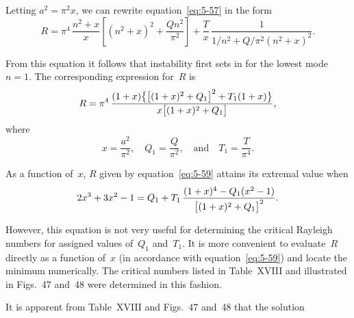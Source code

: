 Letting $a^{2} = \pi^{2}x$, we can rewrite equation~\eqref{eq:5-57} in
the form
\begin{equation}
  R = \pi^{4}\,\frac{n^{2}+x}{x}
  \left[
    (n^{2}+x)^{2}
    + \frac{Qn^{2}}{\pi^{2}}
  \right]
  + \frac{T}{x}\,
  \frac{1}{1/n^{2}+Q/\pi^{2}(n^{2}+x)^{2}}.
  \label{eq:5-58}
\end{equation}

From this equation it follows that instability first sets in for the lowest
mode $n = 1$.  The corresponding expression for~$R$ is
\begin{equation}
  R = \pi^{4}\,\frac{%
    (1+x)
    \bigl\{\bigl[(1+x)^{2}+Q_1\bigr]^{2}
    +T_1(1+x)\bigr\}}{%
    x\bigl[(1+x)^{2}+Q_1\bigr]},
  \label{eq:5-59}
\end{equation}
where
\begin{equation}
  x = \frac{a^{2}}{\pi^{2}}, \quad
  Q_1 = \frac{Q}{\pi^{2}}, \quad\text{and}\quad
  T_1 = \frac{T}{\pi^{4}}.
  \label{eq:5-60}
\end{equation}

As a function of~$x$, $R$ given by equation~\eqref{eq:5-59} attains its
extremal value when
\begin{equation}
  2x^{3}+3x^{2}-1
  = Q_1 + T_1\,
  \frac{(1+x)^{4}-Q_1(x^{2}-1)}{%
    \bigl[(1+x)^{2}+Q_1\bigr]^{2}}.
  \label{eq:5-61}
\end{equation}


However, this equation is not very useful for determining the critical Rayleigh
numbers for assigned values of~$Q_1$ and~$T_1$.  It is more convenient to
evaluate~$R$ directly as a function of~$x$ (in accordance with
equation~\eqref{eq:5-59}) and locate the minimum numerically.  The critical
numbers listed in Table~XVIII and illustrated in Figs.~47 and~48 were
determined in this fashion.

It is apparent from Table~XVIII and Figs.~47 and~48 that the solution

